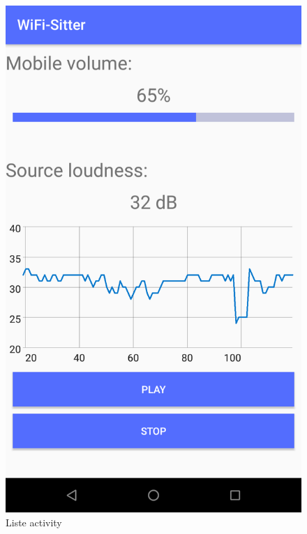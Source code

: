 \documentclass[journal, a4paper]{IEEEtran}
\begin{document}
\begin{figure}[h]
	 \includegraphics[width=\linewidth,scale=0.2]{obrazovka.png}
	 \caption{Liste activity}
	 \label{fig:listenactivity}
\end{figure}
\end{document}
